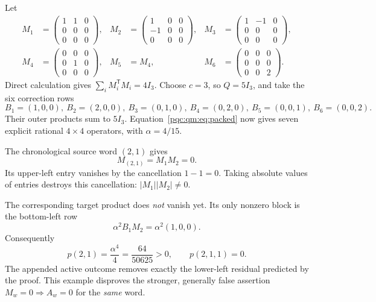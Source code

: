 \documentclass[11pt,letterpaper]{article}
\numberwithin{equation}{section}
\theoremstyle{definition}
\theoremstyle{remark}
\begin{document}
Let
\begin{align*}
 M_1&=\begin{pmatrix}1&1&0\\0&0&0\\0&0&0\end{pmatrix},&
 M_2&=\begin{pmatrix}1&0&0\\-1&0&0\\0&0&0\end{pmatrix},&
 M_3&=\begin{pmatrix}1&-1&0\\0&0&0\\0&0&0\end{pmatrix},\\
 M_4&=\begin{pmatrix}0&0&0\\0&1&0\\0&0&0\end{pmatrix},&
 M_5&=M_4,&
 M_6&=\begin{pmatrix}0&0&0\\0&0&0\\0&0&2\end{pmatrix}.
\end{align*}
Direct calculation gives $\sum_iM_i^{\mathsf T}M_i=4I_3$. Choose $c=3$, so $Q=5I_3$, and take the six correction rows
\begin{equation}
 B_1=(1,0,0),\ B_2=(2,0,0),\ B_3=(0,1,0),\
 B_4=(0,2,0),\ B_5=(0,0,1),\ B_6=(0,0,2).
 \label{pqc:qm:eq:exampleB}
\end{equation}
Their outer products sum to $5I_3$. Equation~\eqref{pqc:qm:eq:packed} now gives seven explicit rational $4\times4$ operators, with $\alpha=4/15$.

The chronological source word $(2,1)$ gives
\[
 M_{(2,1)}=M_1M_2=0.
\]
Its upper-left entry vanishes by the cancellation $1-1=0$. Taking absolute values of entries destroys this cancellation: $|M_1||M_2|\ne0$.

The corresponding target product does \emph{not} vanish yet. Its only nonzero block is the bottom-left row
\[
 \alpha^2 B_1M_2=\alpha^2(1,0,0).
\]
Consequently
\begin{equation}
 p(2,1)=\frac{\alpha^4}{4}=\frac{64}{50625}>0,
 \qquad p(2,1,1)=0.
 \label{pqc:qm:eq:exampleprob}
\end{equation}
The appended active outcome removes exactly the lower-left residual predicted by the proof. This example disproves the stronger, generally false assertion $M_w=0\Rightarrow A_w=0$ for the \emph{same} word.
\end{document}
